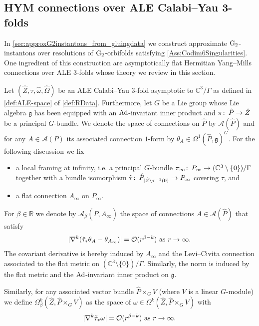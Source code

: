 \documentclass[11pt,a4paper]{scrartcl}
\newcommand{\col}{\colon \thinspace}
\newcommand{\Ad}{\textup{Ad}}
\newcommand{\G}{\textup{G}}
\numberwithin{equation}{section}
\theoremstyle{plain}
\theoremstyle{definition}
\theoremstyle{remark}
\begin{document}
\subsection{HYM connections over ALE Calabi--Yau 3-folds}

In \autoref{sec:approxG2instantons_from_gluingdata} we construct approximate $\G_2$-instantons over resolutions of $\G_2$-orbifolds satisfying \autoref{Ass:Codim6Singularities}. One ingredient of this construction are asymptotically flat Hermitian Yang--Mills connections over ALE $3$-folds whose theory we review in this section.

Let $(\hat{Z},\tau,\hat{\omega},\hat{\Omega})$ be an ALE Calabi--Yau $3$-fold asymptotic to $\mathbb{C}^3/\Gamma$ as defined in \autoref{def:ALE-space} of \autoref{def:RData}. Furthermore, let $G$ be a Lie group whose Lie algebra $\mathfrak{g}$ has been equipped with an $\Ad$-invariant inner product and $\pi \col \hat{P} \to \hat{Z}$ be a principal $G$-bundle. We denote the space of connections on $\hat{P}$ by $\mathcal{A}(\hat{P})$ and for any $A \in \mathcal{A}(P)$ its associated connection $1$-form by $\theta_A \in \Omega^1(\hat{P},\mathfrak{g})^G$. For the following discussion we fix 
\begin{itemize}
\item a local framing at infinity, i.e. a principal $G$-bundle $ \pi_\infty \col P_\infty \to (\mathbb{C}^3\setminus \{0\})/\Gamma$ together with a bundle isomorphism $\tilde{\tau} \col \hat{P}_{\vert \hat{Z}\setminus \tau^{-1}(0)} \to P_\infty$ covering $\tau$, and 
\item a flat connection $A_\infty$ on $P_\infty$.
\end{itemize} 
\begin{definition}
For $\beta \in \mathbb{R}$ we denote by $\mathcal{A}_\beta(\hat{P},A_\infty)$ the space of connections $A\in \mathcal{A}(\hat{P})$ that satisfy \[\vert \nabla^k (\tilde{\tau}_* \theta_A - \theta_{A_\infty} ) \vert = \mathcal{O}(r^{\beta-k})\textup{ as $r \to \infty$.}\] The covariant derivative is hereby induced by $A_\infty$ and the  Levi--Civita connection associated to the flat metric on $(\mathbb{C}^3\setminus \{0\})/\Gamma$. Similarly, the norm is induced by the flat metric and the $\Ad$-invariant inner product on $\mathfrak{g}$.

Similarly, for any associated vector bundle $\hat{P} \times_G V$ (where $V$ is a linear $G$-module) we define $\Omega^k_\beta(\hat{Z},\hat{P}\times_G V)$ as the space of $\omega \in \Omega^k(\hat{Z},\hat{P}\times_G V)$ with \[ \vert \nabla^k\tilde{\tau}_*\omega \vert = \mathcal{O}(r^{\beta-k}) \textup{ as $r\to \infty$.}\]
\end{definition}
\end{document}
